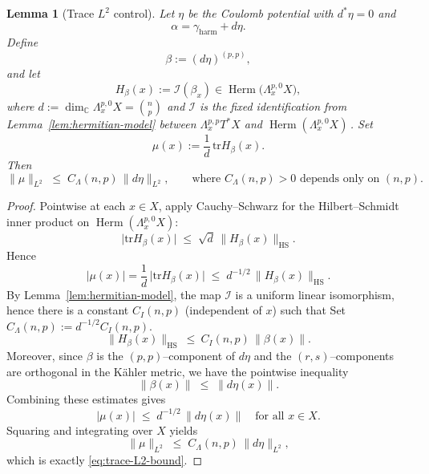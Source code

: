 \documentclass[11pt]{article}
\numberwithin{equation}{section}  %
\theoremstyle{plain}
\newtheorem{lemma}[theorem]{Lemma}
\theoremstyle{definition}
\theoremstyle{remark}
\newcommand{\C}{\mathbb{C}}
\newcommand{\tr}{\mathrm{tr}}
\newcommand{\HS}{\mathrm{HS}}         %
\DeclareMathOperator{\Herm}{Herm}
\newcommand{\harm}{\mathrm{harm}}
\newcommand{\gharm}{\gamma_{\harm}}
\begin{document}
\begin{lemma}[Trace $L^{2}$ control]\label{lem:trace-L2}
	Let $\eta$ be the Coulomb potential with $d^{*}\eta = 0$ and
	\[
	\alpha = \gharm + d\eta.
	\]
	Define
	\[
	\beta := (d\eta)^{(p,p)},
	\]
	and let
	\[
	H_{\beta}(x) := \mathcal{I}(\beta_{x}) \in \Herm\bigl(\Lambda^{p,0}_{x}X\bigr),
	\]
	where $d := \dim_{\C}\Lambda^{p,0}_{x}X = \binom{n}{p}$ and
	$\mathcal{I}$ is the fixed identification from Lemma~\ref{lem:hermitian-model} between
	$\Lambda^{p,p}_{x}T^{*}X$ and $\Herm(\Lambda^{p,0}_{x}X)\,$.
	Set
	\[
	\mu(x) := \frac{1}{d}\,\tr H_{\beta}(x).
	\]
	Then
	\begin{equation}\label{eq:trace-L2-bound}
		\|\mu\|_{L^{2}}
		\;\le\;
		C_{\Lambda}(n,p)\,\|d\eta\|_{L^{2}},
		\qquad
		\text{where } C_{\Lambda}(n,p)>0 \text{ depends only on } (n,p).
	\end{equation}
\end{lemma}


\begin{proof}
	Pointwise at each $x\in X$, apply Cauchy--Schwarz for the Hilbert--Schmidt
	inner product on $\Herm(\Lambda^{p,0}_{x}X)$:
	\[
	\bigl|\tr H_{\beta}(x)\bigr|
	\;\le\;
	\sqrt{d}\,\|H_{\beta}(x)\|_{\HS}.
	\]
	Hence
	\[
	|\mu(x)|
	= \frac{1}{d}\,\bigl|\tr H_{\beta}(x)\bigr|
	\;\le\;
	d^{-1/2}\,\|H_{\beta}(x)\|_{\HS}.
	\]
	By Lemma~\ref{lem:hermitian-model}, the map $\mathcal I$ is a uniform linear isomorphism, hence there is a constant $C_I(n,p)$ (independent of $x$) such that
	Set $C_{\Lambda}(n,p):=d^{-1/2}C_I(n,p)$.
	\[
	\|H_{\beta}(x)\|_{\HS}\ \le\ C_I(n,p)\,\|\beta(x)\|.
	\]
	Moreover, since $\beta$ is the $(p,p)$--component of $d\eta$ and the
	$(r,s)$--components are orthogonal in the K\"ahler metric, we have the
	pointwise inequality
	\[
	\|\beta(x)\| \;\le\; \|d\eta(x)\|.
	\]
	Combining these estimates gives
	\[
	|\mu(x)|
	\;\le\;
	d^{-1/2}\,\|d\eta(x)\|
	\quad\text{for all } x\in X.
	\]
	Squaring and integrating over $X$ yields
	\[
	\|\mu\|_{L^{2}}
	\;\le\;
	C_{\Lambda}(n,p)\,\|d\eta\|_{L^{2}},
	\]
	which is exactly \eqref{eq:trace-L2-bound}.
\end{proof}

\end{document}
